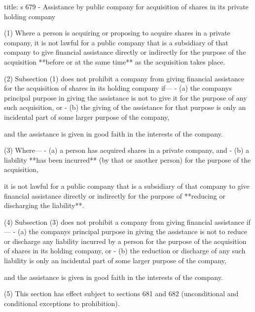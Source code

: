 \documentclass[
]{article}
\newenvironment{Shaded}{}{}
\newcommand{\NormalTok}[1]{#1}
\begin{document}
\begin{Shaded}
\begin{Highlighting}[]
\NormalTok{title: s 679 {-} Assistance by public company for acquisition of shares in its private holding company}

\NormalTok{(1) Where a person is acquiring or proposing to acquire shares in a private company, it is not lawful for a public company that is a subsidiary of that company to give financial assistance directly or indirectly for the purpose of the acquisition **before or at the same time** as the acquisition takes place.}

\NormalTok{(2) Subsection (1) does not prohibit a company from giving financial assistance for the acquisition of shares in its holding company if—}
\NormalTok{{-} (a) the company\textquotesingle{}s principal purpose in giving the assistance is not to give it for the purpose of any such acquisition, or}
\NormalTok{{-} (b) the giving of the assistance for that purpose is only an incidental part of some larger purpose of the company,}

\NormalTok{and the assistance is given in good faith in the interests of the company.}

\NormalTok{(3) Where—}
\NormalTok{{-} (a) a person has acquired shares in a private company, and}
\NormalTok{{-} (b) a liability **has been incurred** (by that or another person) for the purpose of the acquisition,}

\NormalTok{it is not lawful for a public company that is a subsidiary of that company to give financial assistance directly or indirectly for the purpose of **reducing or discharging the liability**.}

\NormalTok{(4) Subsection (3) does not prohibit a company from giving financial assistance if—}
\NormalTok{{-} (a) the company\textquotesingle{}s principal purpose in giving the assistance is not to reduce or discharge any liability incurred by a person for the purpose of the acquisition of shares in its holding company, or}
\NormalTok{{-} (b) the reduction or discharge of any such liability is only an incidental part of some larger purpose of the company,}

\NormalTok{and the assistance is given in good faith in the interests of the company.}

\NormalTok{(5) This section has effect subject to sections 681 and 682 (unconditional and conditional exceptions to prohibition).}
\end{Highlighting}
\end{Shaded}
\end{document}

